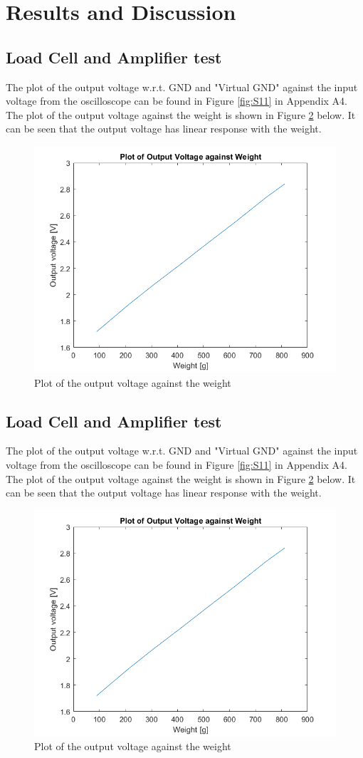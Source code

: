 \documentclass[class=report,11pt,crop=false]{standalone}
\begin{document}
	\section{Results and Discussion}
	\subsection{Load Cell and Amplifier test}
	The plot of the output voltage w.r.t. GND and "Virtual GND" against the input voltage from the oscilloscope can be found in Figure \ref{fig:S11} in Appendix A4. The plot of the output voltage against the weight is shown in Figure \ref{fig:S12} below. It can be seen that the output voltage has linear response with the weight. 
	\begin{figure}[h!]
		\centering
		\includegraphics[width=0.4\linewidth]{Figures/Result2.png}
		\caption{Plot of the output voltage against the weight}
		\label{fig:S12}
	\end{figure}
	
	\subsection{Load Cell and Amplifier test}
	The plot of the output voltage w.r.t. GND and "Virtual GND" against the input voltage from the oscilloscope can be found in Figure \ref{fig:S11} in Appendix A4. The plot of the output voltage against the weight is shown in Figure \ref{fig:S12} below. It can be seen that the output voltage has linear response with the weight. 
	
	\begin{figure}[h!]
		\centering
		\includegraphics[width=0.4\linewidth]{Figures/Result2.png}
		\caption{Plot of the output voltage against the weight}
		\label{fig:S12}
	\end{figure}
	
	\ifstandalone
	
	\printnoidxglossary[type=\acronymtype,nonumberlist]
	\fi
\end{document}
